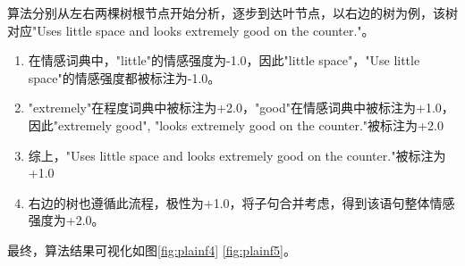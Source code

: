 \begin{center}
\begin{figure}
\end{figure}
\end{center}

算法分别从左右两棵树根节点开始分析，逐步到达叶节点，以右边的树为例，该树对应"Uses little space and looks extremely good on the counter."。\par
\begin{enumerate}

\item 在情感词典中，"little"的情感强度为-1.0，因此"little space"，"Use little space"的情感强度都被标注为-1.0。
\item "extremely"在程度词典中被标注为+2.0，"good"在情感词典中被标注为+1.0，因此"extremely good", "looks extremely good on the counter."被标注为+2.0
\item 综上，"Uses little space and looks extremely good on the counter."被标注为+1.0
\item 右边的树也遵循此流程，极性为+1.0，将子句合并考虑，得到该语句整体情感强度为+2.0。
\end{enumerate}\par
最终，算法结果可视化如图\ref{fig:plainf4} \ref{fig:plainf5}。

